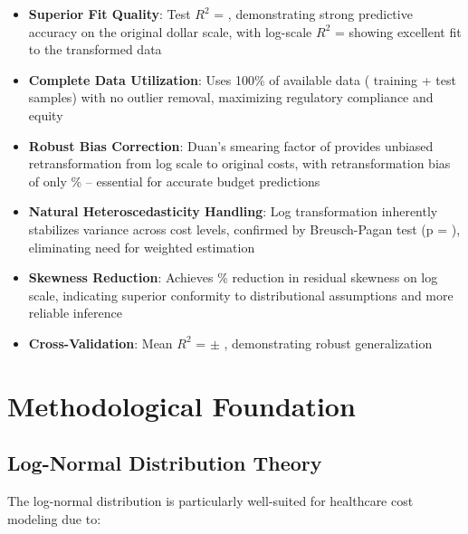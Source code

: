 \begin{itemize}
    \item \textbf{Superior Fit Quality}: Test $R^2$ = \MRSquaredTest{}, demonstrating strong predictive accuracy on the original dollar scale, with log-scale $R^2$ = \ModelSixRSquaredLogScale{} showing excellent fit to the transformed data
    
    \item \textbf{Complete Data Utilization}: Uses 100\% of available data (\MTrainingSamples{} training + \MTestSamples{} test samples) with no outlier removal, maximizing regulatory compliance and equity
    
    \item \textbf{Robust Bias Correction}: Duan's smearing factor of \ModelSixSmearingFactor{} provides unbiased retransformation from log scale to original costs, with retransformation bias of only \ModelSixSmearingBias{}\% -- essential for accurate budget predictions
    
    \item \textbf{Natural Heteroscedasticity Handling}: Log transformation inherently stabilizes variance across cost levels, confirmed by Breusch-Pagan test (p = \ModelSixHeteroscedasticityTest{}), eliminating need for weighted estimation
    
    \item \textbf{Skewness Reduction}: Achieves \ModelSixSkewnessReduction{}\% reduction in residual skewness on log scale, indicating superior conformity to distributional assumptions and more reliable inference
    
    \item \textbf{Cross-Validation}: Mean $R^2$ = \MCVMean{} $\pm$ \MCVStd{}, demonstrating robust generalization
\end{itemize}

\section{Methodological Foundation}

\subsection{Log-Normal Distribution Theory}

The log-normal distribution is particularly well-suited for healthcare cost modeling due to:

